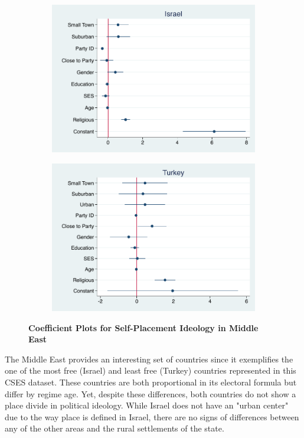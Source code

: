 \documentclass[12pt, titlepage]{article}
\newcommand\tb{\textbf}
\begin{document}
\begin{figure}[H]
	\centering
	\begin{subfigure}[b]{0.475\textwidth}
		\centering
		\includegraphics[width=\textwidth]{IdeologyCoef/Israel}
	\end{subfigure}
	\hfill
	\begin{subfigure}[b]{0.475\textwidth}  
		\centering 
		\includegraphics[width=\textwidth]{IdeologyCoef/Turkey}
	\end{subfigure}
	\caption[ \tb{Self-Placement Ideology - Middle East} ]
	{\tb {Coefficient Plots for Self-Placement Ideology in Middle East} }
	\label{MidEastIdeo}
\end{figure}

The Middle East provides an interesting set of countries since it exemplifies the one of the most free (Israel) and least free (Turkey) countries represented in this CSES dataset. These countries are both proportional in its electoral formula but differ by regime age. Yet, despite these differences, both countries do not show a place divide in political ideology. While Israel does not have an "urban center" due to the way place is defined in Israel, there are no signs of differences between any of the other areas and the rural settlements of the state.
\end{document}
